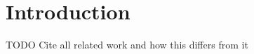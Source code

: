 
\section{Introduction}

TODO Cite all related work and how this differs from it \cite{Smith:2024jd} \cite{Smith:2023qr}